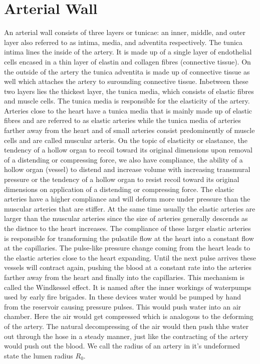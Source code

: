 \documentclass[a4paper, oneside]{discothesis}
\begin{document}
\section{Arterial Wall} \label{aw}
An arterial wall consists of three layers or tunicae: an inner, middle, and outer layer also referred to as intima, media, and adventita respectively.
The tunica intima lines the inside of the artery. It is made up of a single layer of endothelial cells encased in a thin layer of elastin and collagen fibres (connective tissue). 
On the outside of the artery the tunica adventita is made up of connective tissue as well which attaches the artery to surounding connective tissue.
Inbetween these two layers lies the thickest layer, the tunica media, which consists of elastic fibres and muscle cells. 
The tunica media is responsible for the elasticity of the artery.
Arteries close to the heart have a tunica media that is mainly made up of elastic fibres and are referred to as elastic arteries while the tunica media of arteries farther away from the heart and of small arteries consist predominently of muscle cells and are called muscular arteris.
On the topic of elasticity or elastance, the tendency of a hollow organ to recoil toward its original dimensions upon removal of a distending or compressing force, we also have compliance, the ability of a hollow organ (vessel) to distend and increase volume with increasing transmural pressure or the tendency of a hollow organ to resist recoil toward its original dimensions on application of a distending or compressing force.
The elastic arteries have a higher compliance and will deform more under pressure than the muscular arteries that are stiffer.
At the same time usually the elastic arteries are larger than the muscular arteries since the size of arteries generally descends as the distnce to the heart increases.
The compliance of these larger elastic arteries is responsible for transforming the pulsatile flow at the heart into a constant flow at the capillaries.
The pulse-like pressure change coming from the heart leads to the elastic arteries close to the heart expanding.
Until the next pulse arrives these vessels will contract again, pushing the blood at a constant rate into the arteries farther away from the heart and finally into the capillaries.
This mechanism is called the Windkessel effect.
It is named after the inner workings of waterpumps used by early fire brigades.
In these devices water would be pumped by hand from the reservoir causing pressure pulses.
This would push water into an air chamber.
Here the air would get compressed which is analogous to the deforming of the artery.
The natural decompressing of the air would then push thhe water out through the hose in a steady manner, just like the contracting of the artery would push out the blood.
We call the radius of an artery in it's undeformed state the lumen radius $R_0$.
\end{document}
